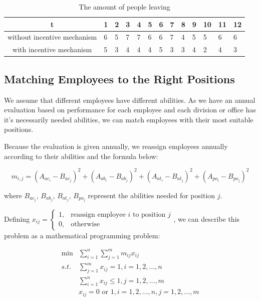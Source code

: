 \documentclass[12pt,a4paper,titlepage]{article}
\begin{document}
\begin{table}[htb] 
  \centering
  \begin{tabular}{cllllllllllll}
    \toprule[2pt]
    t                          &1&2&3&4&5&6&7&8&9&10&11&12 \\
    \midrule{}
    without incentive mechanism&6&5&7&7&6&6&7&4&5&5&6&6 \\
    with incentive mechanism   &5&3&4&4&4&5&3&3&4&2&4&3 \\
  \bottomrule[2pt]
  \end{tabular}
  \caption{The amount of people leaving}
  \label{churn-rate}
\end{table} 

\subsection{Matching Employees to the Right Positions}
\label{sec:matching-employees-to-the-right-position}

We assume that different employees have different abilities. As we have an
annual evaluation based on performance for each employee and each
division or office has it's necessarily needed abilities, we can match
employees with their most suitable positions.

Because the evaluation is given annually, we reassign employees
annually according to their abilities and the formula below:

\begin{equation}
m_{i,j} =
{(A_{ac_i}-B_{ac_j})}^2 + {(A_{ab_i}-B_{ab_j})}^2 + {(A_{at_i}-B_{at_j})}^2
+ {(A_{po_i}-B_{po_j})}^2
\end{equation}

where $B_{ac_j}$, $B_{ab_j}$, $B_{at_j}$, $B_{po_j}$ represent the
abilities needed for position $j$.

Defining $x_{ij}=\begin{cases} 1 , & \mbox{reassign employee } i
  \mbox{ to position } j \\ 0,&\mbox{otherwise} \end{cases}$, we can
describe this problem as a mathematical programming problem:

\begin{equation}
  \begin{split}
  \min&\sum_{i=1}^n\sum_{j=1}^m m_{ij}x_{ij} \\
  s.t.& \sum_{j=1}^m x_{ij}=1, i=1,2,\ldots,n \\
  &\sum_{i=1}^n x_{ij} \le1,j=1,2,\ldots,m \\
  &x_{ij}=0 \mbox{ or } 1,i=1,2,\ldots,n,j=1,2,\ldots,m
  \end{split}
\end{equation}
\end{document}
